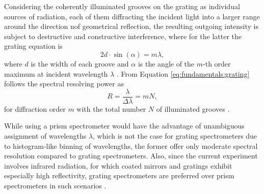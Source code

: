 Considering the coherently illuminated grooves on the grating as individual sources of radiation, each of them diffracting the incident light into a larger range around the direction nof geometrical reflection, the resulting outgoing intensity is subject to destructive and constructive interference, where for the latter the grating equation is
\begin{equation}
    \label{eq:fundamentals:grating}
    2 d \cdot \sin(\alpha) = m \lambda ,
\end{equation}
where $d$ is the width of each groove and $\alpha$ is the angle of the $m$-th order maximum at incident wavelength $\lambda$ \cite{demtroder2014laser}. From Equation \ref{eq:fundamentals:grating} follows the spectral resolving power as
\begin{equation}
    \label{eq:fundamentals:resolving}
    R = \frac{\lambda}{\Delta \lambda} = m N ,
\end{equation}
for diffraction order $m$ with the total number $N$ of illuminated grooves \cite{demtroder2014laser}.

While using a prism spectrometer would have the advantage of unambiguous assignment of wavelengths $\lambda$, which is not the case for grating spectrometers due to histogram-like binning of wavelengths, the former offer only moderate spectral resolution compared to grating spectrometers. Also, since the current experiment involves infrared radiation, for which coated mirrors and gratings exhibit especially high reflectivity, grating spectrometers are preferred over prism spectrometers in such scenarios \cite{demtroder2014laser}.

\newpage